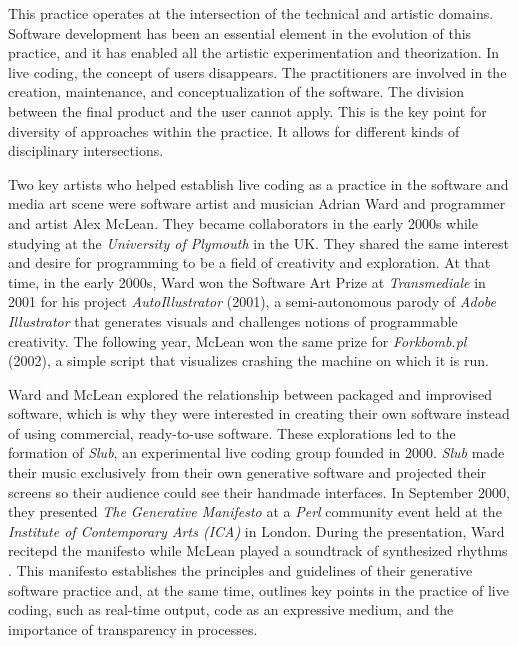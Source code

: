 \documentclass[12pt, twoside, a4paper]{report}
\begin{document}
This practice operates at the intersection of the technical and artistic domains. Software
development has been an essential element in the evolution of this practice, and it
has enabled all the artistic experimentation and theorization. In live coding, the concept of users disappears. The practitioners are involved in the
creation, maintenance, and conceptualization of the software. The division between
the final product and the user cannot apply. This is the key point for diversity of
approaches within the practice. It allows for different kinds of disciplinary intersections.

Two key artists who helped establish live coding as a practice in the software and media art scene were software artist and musician Adrian Ward and programmer and artist Alex McLean. They became collaborators in the early 2000s while studying at the \textit{University of Plymouth} in the UK. They shared the same interest and desire for programming to be a field of creativity and exploration. At that time, in the early 2000s, Ward won the Software Art Prize at \textit{Transmediale} in 2001 for his project \textit{AutoIllustrator} (2001), a semi-autonomous parody of \textit{Adobe Illustrator} that generates visuals and challenges notions of programmable creativity. The following year, McLean won the same prize for \textit{Forkbomb.pl} (2002), a simple script that visualizes crashing the machine on which it is run.



Ward and McLean explored the relationship between packaged and improvised software, which is why they were interested in creating their own software instead of using commercial, ready-to-use software. These explorations led to the formation of \textit{Slub}, an experimental live coding group founded in 2000. \textit{Slub} made their music exclusively from their own generative software and projected their screens so their audience could see their handmade interfaces. In September 2000, they presented \textit{The Generative Manifesto} at a \textit{Perl} community event held at the  \textit{Institute of Contemporary Arts (ICA)} in London. During the presentation, Ward recitepd the manifesto while McLean played a soundtrack of synthesized rhythms \citep{history}. This manifesto establishes the principles and guidelines of their generative software practice and, at the same time, outlines key points in the practice of live coding, such as real-time output, code as an expressive medium, and the importance of transparency in processes. 
\end{document}
